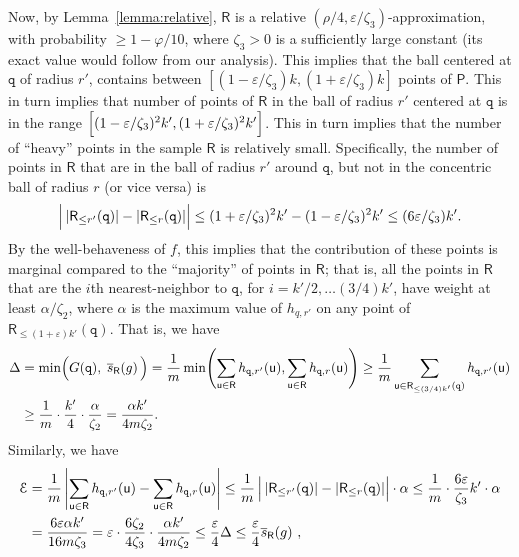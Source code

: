 \documentclass[12pt]{article}
\providecommand{\lemref}[1]{Lemma~\ref{lemma:#1}}
\theoremstyle{remark}{\theorembodyfont{\rm} \newtheorem{remark}[theorem]{Remark}}
\newcommand{\MakeBig}{\rule[-.2cm]{0cm}{0.4cm}}
\newcommand{\pth}[2][\!]{#1\left({#2}\right)}
\newcommand{\pbrc}[2][\!\!]{#1\left[ {#2} \MakeBig \right]}
\newcommand{\cardin}[1]{\left\lvert {#1} \right\rvert}
\newcommand{\eps}{{\varepsilon}}\newcommand{\divides}{|}
\newcommand{\PntSet}{\mathsf{P}}
\newcommand{\query}{\mathtt{q}}
\newcommand{\pntA}{\mathsf{u}}
\renewcommand{\th}{th\xspace}
\newcommand{\constC}{\zeta_2}
\newcommand{\constD}{\zeta_3}
\newcommand{\PkExt}[4][\!]{{#2}_{\leq #3}\pth[#1]{#4}}
\newcommand{\BadProb}{\varphi}
\newcommand{\prob}{\rho}
\newcommand{\sMeasureX}[2]{\overline{s}_{#2}\pth{#1}}
\newcommand{\RSample}{\mathsf{R}}
\newcommand{\Error}{\EuScript{E}}
\begin{document}
Now, by \lemref{relative}, $\RSample$ is a relative
$(\prob/4,\eps/\constD )$-approximation, with probability $\geq
1-\BadProb/10$, where $\constD > 0$ is a sufficiently large constant
(its exact value would follow from our analysis). This implies that
the ball centered at $\query$ of radius $r'$, contains between
$[(1-\eps/\constD)k, (1+\eps/\constD)k]$ points of $\PntSet$. This in
turn implies that number of points of $\RSample$ in the ball of radius
$r'$ centered at $\query$ is in the range
$\pbrc[]{(1-\eps/\constD)^2k', (1+\eps/\constD)^2k'}$. This in turn
implies that the number of ``heavy'' points in the sample $\RSample$
is relatively small. Specifically, the number of points in $\RSample$
that are in the ball of radius $r'$ around $\query$, but not in the
concentric ball of radius $r$ (or vice versa) is
\begin{align*}
    \cardin{ \MakeBig \cardin{\PkExt{\RSample}{r'}{\query}} -
       \cardin{\PkExt{\RSample}{r}{\query}} }\leq (1+\eps/\constD)^2k' - (1-\eps/\constD)^2k'\leq (6
    \eps/\constD)k'.
\end{align*}
By the well-behaveness of $f$, this implies that the contribution of
these points is marginal compared to the ``majority'' of points in
$\RSample$; that is, all the points in $\RSample$ that are the $i$\th
nearest-neighbor to $\query$, for $i=k'/2, \ldots (3/4)k'$, have
weight at least $\alpha/\constC$, where $\alpha$ is the maximum value
of $h_{q,r'}$ on any point of
$\PkExt{\RSample}{(1+\eps)k'}{\query}$. That is, we have
\begin{align*}
    \Delta &=\min \pth{G(\query), \; \sMeasureX{g}{\RSample} \MakeBig }=\frac{1}{m} \min \pth{ \sum_{\pntA \in \RSample}
       h_{\query,r'}(\pntA) , \sum_{\pntA \in \RSample}
       h_{\query,r}(\pntA) }\geq \frac{1}{m} \sum_{\pntA \in \PkExt[]{\RSample}{(3/4)k'}{\query}}
    h_{\query,r'}(\pntA)\\
    &\geq \frac{1}{m} \cdot \frac{k'}{4} \cdot \frac{\alpha}{\constC}=\frac{\alpha k' }{4 m \constC}.
\end{align*}
Similarly,  we have 
\begin{align*}
    \Error &= \frac{1}{m} \cardin{ \sum_{\pntA \in \RSample}
       h_{\query,r'}(\pntA) - \sum_{\pntA \in \RSample}
       h_{\query,r}(\pntA) }\leq \frac{1}{m} \cardin{ \MakeBig \cardin{\PkExt{\RSample}{r'}{\query}} -
       \cardin{\PkExt{\RSample}{r}{\query}} }\cdot \alpha \leq \frac{1}{m} \cdot \frac{6 \eps}{\constD}k'\cdot \alpha \\
    &= \frac{6 \eps \alpha k'}{16m \constD}=\eps \cdot \frac{6 \constC }{4\constD} \cdot \frac{\alpha k'}{4m
       \constC}\leq \frac{\eps}{4} \Delta \leq \frac{\eps}{4} \sMeasureX{g}{\RSample} \,,
\end{align*}
\end{document}
